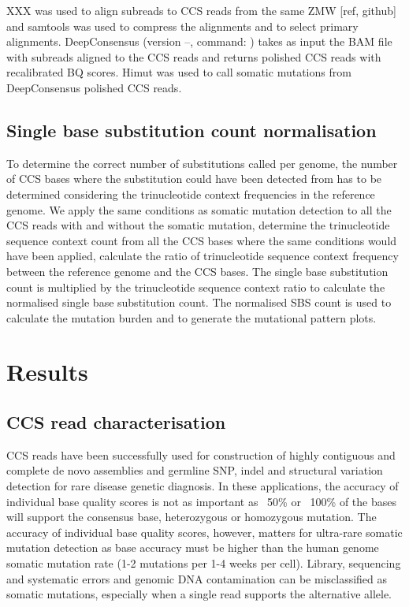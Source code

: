 XXX was used to align subreads to CCS reads from the same ZMW [ref, github] and samtools was used to compress the alignments and to select primary alignments. DeepConsensus (version --, command: ) takes as input the BAM file with subreads aligned to the CCS reads and returns polished CCS reads with recalibrated BQ scores. Himut was used to call somatic mutations from DeepConsensus polished CCS reads. 

\subsection{Single base substitution count normalisation}
To determine the correct number of substitutions called per genome, the number of CCS bases where the substitution could have been detected from has to be determined considering the trinucleotide context frequencies in the reference genome. We apply the same conditions as somatic mutation detection to all the CCS reads with and without the somatic mutation, determine the trinucleotide sequence context count from all the CCS bases where the same conditions would have been applied, calculate the ratio of trinucleotide sequence context frequency between the reference genome and the CCS bases. The single base substitution count is multiplied by the trinucleotide sequence context ratio to calculate the normalised single base substitution count. The normalised SBS count is used to calculate the mutation burden and to generate the mutational pattern plots. 

\section{Results}

\subsection{CCS read characterisation}

CCS reads have been successfully used for construction of highly contiguous and complete de novo assemblies and germline SNP, indel and structural variation detection for rare disease genetic diagnosis. In these applications, the accuracy of individual base quality scores is not as important as ~50\% or ~100\% of the bases will support the consensus base, heterozygous or homozygous mutation. The accuracy of individual base quality scores, however, matters for ultra-rare somatic mutation detection as base accuracy must be higher than the human genome somatic mutation rate (1-2 mutations per 1-4 weeks per cell). Library, sequencing and systematic errors and genomic DNA contamination can be misclassified as somatic mutations, especially when a single read supports the alternative allele. 

